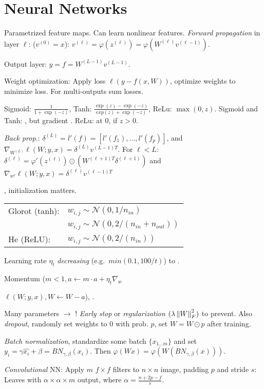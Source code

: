 \section{Neural Networks}

Parametrized feature maps. Can learn nonlinear features.
\emph{Forward propagation} in layer $\ell$: ($v^{(0)} = x$): $v^{(\ell)} =
\varphi (z^{(\ell)}) = \varphi(W^{(\ell)} v^{(\ell-1)})$.

Output layer: $y = f = W^{(L-1)} v^{(L-1)}$.

Weight optimization: Apply loss $\ell(y - f(x, W))$, optimize weights to
minimize loss. For multi-outputs sum losses.

Sigmoid: $\frac{1}{1+\exp(-z)}$, Tanh: $\frac{\exp(z) - \exp(-z)}{exp(z) + \exp(-z)}$, ReLu: $\max(0, z)$. Sigmoid and Tanh:  , but gradient . ReLu:  at $0$,  if $z > 0$.

\emph{Back prop.}: $\delta^{(L)} = l'(f) = [l'(f_1) ,..., l'(f_p)]$, and $\nabla_{W^{(L)}} \ell(W;y,x) = \delta^{(L)}
v^{(L-1)T}$. For $\ell < L$: $\delta^{(\ell)} = \varphi' (z^{(\ell)}) \odot
(W^{(\ell+1)T}\delta^{(\ell+1)})$ and $\nabla_{w^{\ell}} \ell(W;y,x) =
\delta^{(\ell)}v^{(\ell-1)T}$

, initialization matters.

\begin{tabular}{ll}
Glorot (tanh): & $w_{i,j}  \sim \mathcal{N}(0, 1/n_{in})$  \\
               		& $w_{i,j}  \sim \mathcal{N}(0, 2/(n_{in} + n_{out}))$  \\
He (ReLU):     & $w_{i,j}  \sim \mathcal{N}(0, 2/(n_{in}))$
\end{tabular}

Learning rate $\eta_t$ \emph{decreasing} (e.g.\ $min(0.1,100/t)$) to . 

Momentum ($m<1, a \leftarrow m \cdot a + \eta_t \nabla_w$

$ \ell(W;y,x), W \leftarrow W - a$), .

Many parameters $\rightarrow$ ! \emph{Early stop} or
\emph{regularization $(\lambda \left\lVert W\right\rVert_F^2)$} to prevent. Also \emph{dropout},
randomly set weights to $0$ with prob. $p$, set $W = W \odot p$ after training.

\emph{Batch normalization}, standardize some batch $\{x_{1\dots m}\}$ and set
$y_i = \gamma \hat{x_i} + \beta = BN_{\gamma,\beta}(x_i)$. Then $\varphi(Wx) = \varphi(W
(BN_{\gamma,\beta}(x)))$.

\emph{Convolutional} NN: Apply $m$ $f\times f$ filters to $n\times n$ image,
padding $p$ and stride $s$: Leaves with $\alpha \times \alpha \times m$ output,
where $\alpha = \frac{n+2p-f}{s}$.
